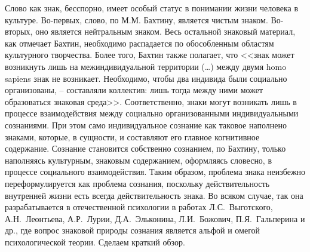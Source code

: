Слово как знак, бесспорно, имеет особый статус в понимании жизни
человека в культуре. Во-первых, слово, по М.М. Бахтину, является чистым знаком. Во-вторых,
оно является нейтральным знаком. Весь остальной знаковый материал, как
отмечает Бахтин, необходимо распадается по обособленным областям
культурного творчества.\autocite{voloshinov1993} Более того,
Бахтин также полагает, что <<знак может возникнуть лишь на
межиндивидуальной территории (\ldots) между двумя homo sapiens знак не
возникает. Необходимо, чтобы два индивида были социально
организованы, -- составляли коллектив: лишь тогда между ними может
образоваться знаковая среда>>.\autocite{voloshinov1993} Соответственно, знаки могут
возникать лишь в процессе взаимодействия между социально
организованными индивидуальными сознаниями. При этом само
индивидуальное сознание как таковое наполнено знаками, которые, в
сущности, и составляют его главное когнитивное содержание. Сознание
становится собственно сознанием, по Бахтину, только наполняясь
культурным, знаковым содержанием, оформляясь словесно, в процессе
социального взаимодействия. Таким образом, проблема знака неизбежно
переформулируется как проблема сознания, поскольку действительность
внутренней жизни есть всегда действительность знака. Во всяком случае,
так она разрабатывается в отечественной психологии в работах Л.С.~Выготского,
А.Н.~Леонтьева, А.Р.~Лурии, Д.А.~Эльконина, Л.И.~Божович,
П.Я.~Гальперина и др., где вопрос знаковой природы сознания является
альфой и омегой психологической теории. Сделаем краткий обзор.

